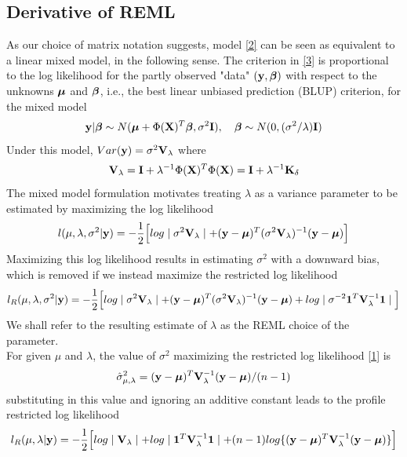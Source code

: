 \documentclass[11pt]{article}
\begin{document}
\subsection{\textbf{Derivative of REML}}
As our choice of matrix notation suggests, model \eqref{2} can be seen as equivalent to a linear mixed model, in the following sense. The criterion in \eqref{3} is proportional to the log likelihood for the partly observed "data" $({\bf y}, \boldsymbol{\beta})$ with respect to the unknowns $\boldsymbol{\mu}$ and $\boldsymbol{\beta}$, i.e., the best linear unbiased prediction (BLUP) criterion, for the mixed model
\begin{align*}
{\bf y}|\boldsymbol{\beta} \sim N(\boldsymbol{\mu}+\Phi({\bf X})^T \boldsymbol{\beta}, \sigma^2{\bf I}), \quad \boldsymbol{\beta} \sim N(0, (\sigma^2/\lambda) {\bf I})
\end{align*}
Under this model, $Var({\bf y})=\sigma^2 {\bf V}_\lambda$ where
\begin{align}
{\bf V}_\lambda={\bf I}+\lambda^{-1}\Phi({\bf X})^T\Phi({\bf X})={\bf I}+\lambda^{-1}{\bf K}_\delta
\end{align}
The mixed model formulation motivates treating $\lambda$ as a variance parameter to be estimated by maximizing the log likelihood
\begin{align*}
l(\mu, \lambda, \sigma^2|{\bf y})=-\frac{1}{2}\Big[log\mid \sigma^2 {\bf V}_\lambda \mid +({\bf y}-\boldsymbol{\mu})^T(\sigma^2 {\bf V}_\lambda)^{-1}({\bf y}-\boldsymbol{\mu}) \Big]
\end{align*}
Maximizing this log likelihood results in estimating $\sigma^2$ with a downward bias, which is removed if we instead maximize the restricted log likelihood
\begin{align}
l_R(\mu, \lambda, \sigma^2|{\bf y})=-\frac{1}{2}\Big[log\mid \sigma^2 {\bf V}_\lambda \mid +({\bf y}-\boldsymbol{\mu})^T(\sigma^2 {\bf V}_\lambda)^{-1}({\bf y}-\boldsymbol{\mu})+log \mid \sigma^{-2}\mathbf{1}^T{\bf V}_\lambda^{-1}\mathbf{1} \mid \Big] \label{1} 
\end{align}
We shall refer to the resulting estimate of $\lambda$ as the REML choice of the parameter.\\
For given $\mu$ and $\lambda$, the value of $\sigma^2$ maximizing the restricted log likelihood \eqref{1} is
\begin{align}
\hat{\sigma}_{\mu, \lambda}^2=({\bf y}-\boldsymbol{\mu})^T{\bf V}_\lambda^{-1}({\bf y}-\boldsymbol{\mu})/(n-1)
\end{align}
substituting in this value and ignoring an additive constant leads to the profile restricted log likelihood
\begin{align}
l_R(\mu, \lambda|{\bf y})=-\frac{1}{2}\Big[log\mid {\bf V}_\lambda \mid +log \mid \mathbf{1}^T{\bf V}_\lambda^{-1}\mathbf{1} \mid+(n-1)log\{({\bf y}-\boldsymbol{\mu})^T {\bf V}_\lambda^{-1}({\bf y}-\boldsymbol{\mu})\}\Big] \label{5}
\end{align}
\end{document}
